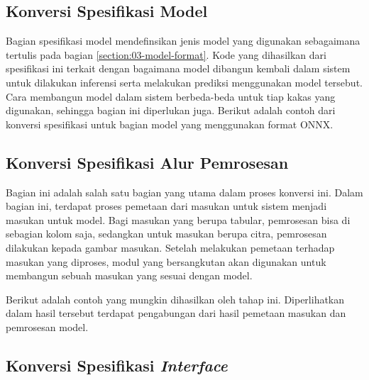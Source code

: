 
\subsection{Konversi Spesifikasi Model}

Bagian spesifikasi model mendefinsikan jenis model yang digunakan sebagaimana tertulis pada bagian \ref{section:03-model-format}.
Kode yang dihasilkan dari spesifikasi ini terkait dengan bagaimana model dibangun kembali dalam sistem untuk dilakukan inferensi serta melakukan prediksi menggunakan model tersebut.
Cara membangun model dalam sistem berbeda-beda untuk tiap kakas yang digunakan, sehingga bagian ini diperlukan juga.
Berikut adalah contoh dari konversi spesifikasi untuk bagian model yang menggunakan format ONNX.


\subsection{Konversi Spesifikasi Alur Pemrosesan}

Bagian ini adalah salah satu bagian yang utama dalam proses konversi ini.
Dalam bagian ini, terdapat proses pemetaan dari masukan untuk sistem menjadi masukan untuk model.
Bagi masukan yang berupa tabular, pemrosesan bisa di sebagian kolom saja, sedangkan untuk masukan berupa citra, pemrosesan dilakukan kepada gambar masukan.
Setelah melakukan pemetaan terhadap masukan yang diproses, modul yang bersangkutan akan digunakan untuk membangun sebuah masukan yang sesuai dengan model.

Berikut adalah contoh yang mungkin dihasilkan oleh tahap ini.
Diperlihatkan dalam hasil tersebut terdapat pengabungan dari hasil pemetaan masukan dan pemrosesan model.


\subsection{Konversi Spesifikasi \textit{Interface}}
